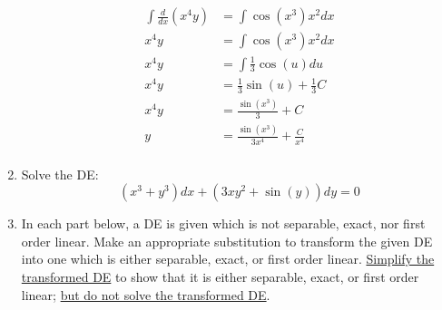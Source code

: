 \documentclass[exam=1]{math252exam}
\begin{document}
\begin{enumerate}[label=\arabic*.]
{\begin{equation*}
\begin{aligned}
		\int \frac{d}{dx} \left( x^{4}y \right) &= \int \cos(x^{3})x^{2} dx\\
		x^{4}y &= \int \cos(x^{3})x^{2} dx\\
		x^{4}y &= \int \frac{1}{3}\cos(u)du\\
		x^{4}y &= \frac{1}{3}\sin(u) + \frac{1}{3}C\\
		x^{4}y &= \frac{\sin(x^{3})}{3} + C\\
		y &= \frac{\sin(x^{3})}{3x^{4}} + \frac{C}{x^{4}}\\
	\end{aligned}
	\end{equation*}}
	\item Solve the DE: \[ (x^{3} + y^{3})dx + (3xy^{2} + \sin(y))dy = 0 \]
	\item In each part below, a DE is given which is not separable, exact, nor first order linear. Make an appropriate substitution to transform the given DE into one which is either separable, exact, or first order linear. \underline{Simplify the transformed DE} to show that it is either separable, exact, or first order linear; \underline{but do not solve the transformed DE}.

\end{enumerate}
\end{document}
